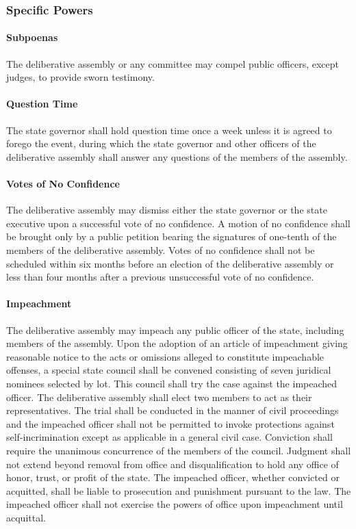 \documentclass{article}
\begin{document}
\subsubsection{Specific Powers}
\paragraph{Subpoenas}
The deliberative assembly or any committee may compel public officers, except judges, to provide sworn testimony.
\paragraph{Question Time}
The state governor shall hold question time once a week unless it is agreed to forego the event, during which the state governor and other officers of the deliberative assembly shall answer any questions of the members of the assembly.
\paragraph{Votes of No Confidence}
The deliberative assembly may dismiss either the state governor or the state executive upon a successful vote of no confidence. A motion of no confidence shall be brought only by a public petition bearing the signatures of one-tenth of the members of the deliberative assembly. Votes of no confidence shall not be scheduled within six months before an election of the deliberative assembly or less than four months after a previous unsuccessful vote of no confidence.
\paragraph{Impeachment}
The deliberative assembly may impeach any public officer of the state, including members of the assembly. Upon the adoption of an article of impeachment giving reasonable notice to the acts or omissions alleged to constitute impeachable offenses, a special state council shall be convened consisting of seven juridical nominees selected by lot. This council shall try the case against the impeached officer. The deliberative assembly shall elect two members to act as their representatives. The trial shall be conducted in the manner of civil proceedings and the impeached officer shall not be permitted to invoke protections against self-incrimination except as applicable in a general civil case. Conviction shall require the unanimous concurrence of the members of the council. Judgment shall not extend beyond removal from office and disqualification to hold any office of honor, trust, or profit of the state. The impeached officer, whether convicted or acquitted, shall be liable to prosecution and punishment pursuant to the law. The impeached officer shall not exercise the powers of office upon impeachment until acquittal.
\end{document}
